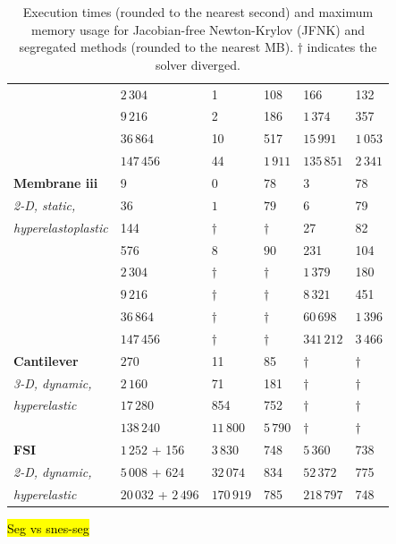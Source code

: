 \documentclass[sn-mathphys,Numbered]{sn-jnl}%
\begin{document}
\begin{table}[!htbp]
\begin{tabular}{ll|ll|ll}
							& $2\,304$ 		& 1 & 108 		& 166 & 132  \\
							& $9\,216$ 		& 2 & 186  	& $1\,374$ & 357 \\
							& $36\,864$ 		& 10 & 517  	& $15\,991$ & $1\,053$ \\
							& $147\,456$ 		& 44 & $1\,911$ & $135\,851$ & $2\,341$ \\
			\hline
			\textbf{Membrane iii} & 9 & $0$ & $78$	& 3 & 78 \\
			\emph{2-D, static,} & 36 & $1$ & $79$	& 6 & 79 \\
			\emph{hyperelastoplastic}& 144 & $\dag$ & $\dag$	& 27 & 82 \\
				& 576 & 			$8$ & $90$ 			& 231 & 104 \\
				& $2\,304$ & 		$\dag$ & $\dag$		& $1\,379$ & 180 \\
				& $9\,216$ & 		$\dag$ & $\dag$			& $8\,321$ & 451 \\
				& $36\,864$ & 		$\dag$ & $\dag$ 		& $60\,698$ & $1\,396$ \\
				& $147\,456$ & 	$\dag$ & $\dag$ 		& $341\,212$ & $3\,466$ \\
			\hline
			\textbf{Cantilever} & $270$ & 11 & 85 		& $\dag$ & $\dag$ \\
			\emph{3-D, dynamic,} & $2\,160$ & 71 & 181 	& $\dag$ & $\dag$ \\
			\emph{hyperelastic}& $17\,280$ & 854 & 752 	& $\dag$ & $\dag$ \\
				& $138\,240$ & $11\,800$ & $5\,790$ 	& $\dag$ & $\dag$ \\
			\hline
			\textbf{FSI} & $1\,252$ + 156 & $3\,830$ & 748 				& $5\,360$ & 738 \\
			\emph{2-D, dynamic,}	& $5\,008$ + 624 & $32\,074$ & 834 	& $52\,372$ & 775 \\
			\emph{hyperelastic} & $20\,032$ + $2\,496$ & $170\,919$ & 785 	& $218\,797$ & 748 \\
			\hline
		\end{tabular}
	\caption{Execution times (rounded to the nearest second) and maximum memory usage for Jacobian-free Newton-Krylov (JFNK) and segregated methods (rounded to the nearest MB). $\dag$ indicates the solver diverged. }
	\label{tab:times_memory}
\end{table}
\hl{Seg vs snes-seg}
\end{document}
